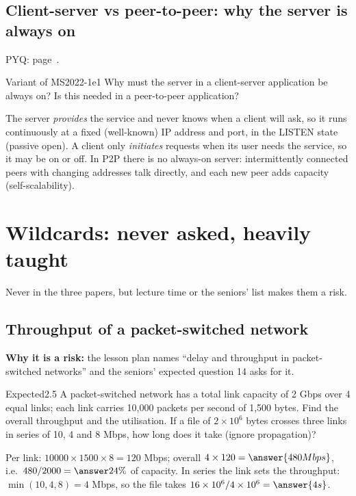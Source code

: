 \subsection{Client-server vs peer-to-peer: why the server is always on}\label{iq:C10}
     \quad PYQ: page~\pageref{q:MS2022-1e}.
\begin{question}{Variant of MS2022-1e}{1}
Why must the server in a client-server application be always on? Is this needed in a peer-to-peer application?
\end{question}
\begin{solution}[outline]
The server \emph{provides} the service and never knows when a client will ask, so it runs continuously at a fixed (well-known) IP address and port, in the LISTEN state (passive open). A client only \emph{initiates} requests when its user needs the service, so it may be on or off. In P2P there is no always-on server: intermittently connected peers with changing addresses talk directly, and each new peer adds capacity (self-scalability).
\end{solution}

\section{Wildcards: never asked, heavily taught}
Never in the three papers, but lecture time or the seniors' list makes them a risk.

\subsection{Throughput of a packet-switched network}\label{iq:C03}
   

\textbf{Why it is a risk:} the lesson plan names ``delay and throughput in packet-switched networks'' and the seniors' expected question 14 asks for it.
\begin{question}{Expected}{2.5}
A packet-switched network has a total link capacity of 2 Gbps over 4 equal links; each link carries 10,000 packets per second of 1,500 bytes. Find the overall throughput and the utilisation. If a file of $2\times10^{6}$ bytes crosses three links in series of 10, 4 and 8 Mbps, how long does it take (ignore propagation)?
\end{question}
\begin{solution}
Per link: $10000\times1500\times8=120$ Mbps; overall $4\times120=\answer{480 Mbps}$, i.e.\ $480/2000=\answer{24\%}$ of capacity. In series the  link sets the throughput: $\min(10,4,8)=4$ Mbps, so the file takes $16\times10^{6}/4\times10^{6}=\answer{4 s}$.
\end{solution}

